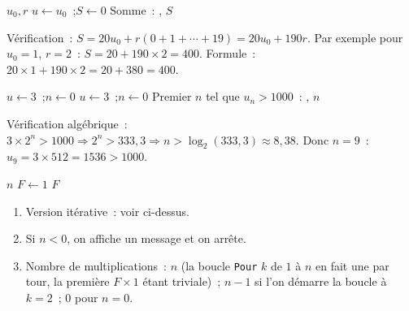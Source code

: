 
\begin{algorithm}[H]
\caption{Suite arithm\'etique et somme}
\Lire $u_0, r$\;
$u \leftarrow u_0$~;\quad $S \leftarrow 0$\;
\Afficher \og Somme~: \fg, $S$\;
\end{algorithm}

V\'erification~: $S = 20u_0 + r(0+1+\cdots+19)=20u_0+190r$.
Par exemple pour $u_0=1$, $r=2$~: $S=20+190\times2=400$.
Formule~: $20\times1+190\times2=20+380=400$.\checkmark


\begin{algorithm}[H]
\caption{Suite g\'eom\'etrique $u_n=3\times2^n$}
$u \leftarrow 3$~;\quad $n \leftarrow 0$\;
$u \leftarrow 3$~;\quad $n \leftarrow 0$\;
\Afficher \og Premier $n$ tel que $u_n>1000$~: \fg, $n$\;
\end{algorithm}

V\'erification alg\'ebrique~: $3\times2^n>1000\Rightarrow2^n>333{,}3\Rightarrow n>\log_2(333{,}3)\approx8{,}38$.
Donc $n=9$~: $u_9=3\times512=1536>1000$.\checkmark


\begin{algorithm}[H]
\caption{Factorielle}
\Lire $n$\;
$F \leftarrow 1$\;
\Afficher $F$\;
\end{algorithm}

\begin{enumerate}
  \item Version it\'erative~: voir ci-dessus.
  \item Si $n<0$, on affiche un message et on arr\^ete.
  \item Nombre de multiplications~: $n$ (la boucle \texttt{Pour} $k$ de $1$ \`a $n$ en fait une par tour, la premi\`ere $F\times1$ \'etant triviale)~; $n-1$ si l'on d\'emarre la boucle \`a $k=2$~; $0$ pour $n=0$.
\end{enumerate}

